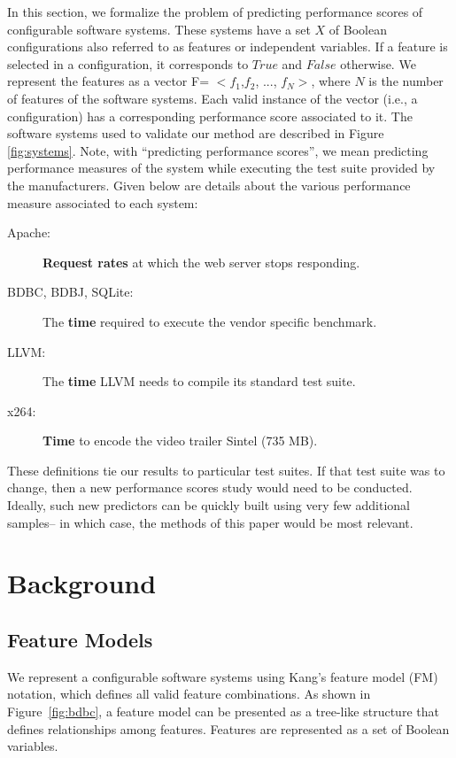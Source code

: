 \documentclass{sig-alternative}
\begin{document}
In this section, we formalize the problem of predicting performance scores of configurable software systems. These systems have a set $X$ of Boolean configurations  also referred to as features or independent variables. If a feature is selected in a configuration, it corresponds to $True$ and $False$ otherwise. We represent the features as a vector F=  $<f_1$,$f_2$, ..., $f_N>$, where $N$ is the number of features of the software systems. Each valid instance of the vector (i.e., a configuration) has a corresponding performance score associated to it. The software systems used to validate our method are described in Figure \ref{fig:systems}.
Note, with ``predicting performance scores'', we 
mean predicting performance measures of the system while executing the test suite provided by the manufacturers. Given below are details about the various performance measure associated to  each system:
\begin{description}
\item[Apache:]  \textbf{Request rates} at which the web server stops responding. 
\item[BDBC, BDBJ, SQLite:] The \textbf{time} required to execute the vendor specific benchmark. 
\item[LLVM:] The \textbf{time} LLVM needs to compile its standard test suite. 
\item[x264:] \textbf{Time}   to encode the video trailer Sintel (735 MB). 
\end{description}

These definitions tie our results to particular test suites.
If that test suite was to change, then a  new
performance scores study would need  to be conducted. Ideally, such new predictors
can be quickly built using very few additional samples-- in which case, the methods
of this paper would be most relevant.

 



\section{Background}  

\subsection{Feature Models}
We represent a configurable software systems using Kang's feature model (FM) notation, which defines all valid feature combinations. 
As shown in Figure~\ref{fig:bdbc}, a feature model can be presented as a tree-like structure that defines relationships among features.   Features are represented as a set of Boolean variables. 
\end{document}
